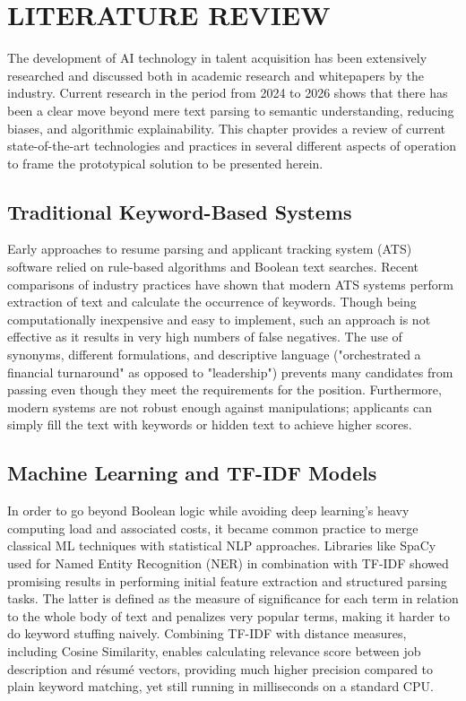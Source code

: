 \chapter{LITERATURE REVIEW}

The development of AI technology in talent acquisition has been extensively researched and discussed both in academic research and whitepapers by the industry. Current research in the period from 2024 to 2026 shows that there has been a clear move beyond mere text parsing to semantic understanding, reducing biases, and algorithmic explainability. This chapter provides a review of current state-of-the-art technologies and practices in several different aspects of operation to frame the prototypical solution to be presented herein.

\section{Traditional Keyword-Based Systems}
Early approaches to resume parsing and applicant tracking system (ATS) software relied on rule-based algorithms and Boolean text searches. Recent comparisons of industry practices have shown that modern ATS systems perform extraction of text and calculate the occurrence of keywords. Though being computationally inexpensive and easy to implement, such an approach is not effective as it results in very high numbers of false negatives. The use of synonyms, different formulations, and descriptive language ("orchestrated a financial turnaround" as opposed to "leadership") prevents many candidates from passing even though they meet the requirements for the position. Furthermore, modern systems are not robust enough against manipulations; applicants can simply fill the text with keywords or hidden text to achieve higher scores.

\section{Machine Learning and TF-IDF Models}
In order to go beyond Boolean logic while avoiding deep learning's heavy computing load and associated costs, it became common practice to merge classical ML techniques with statistical NLP approaches. Libraries like SpaCy used for Named Entity Recognition (NER) in combination with TF-IDF showed promising results in performing initial feature extraction and structured parsing tasks. The latter is defined as the measure of significance for each term in relation to the whole body of text and penalizes very popular terms, making it harder to do keyword stuffing naively. Combining TF-IDF with distance measures, including Cosine Similarity, enables calculating relevance score between job description and résumé vectors, providing much higher precision compared to plain keyword matching, yet still running in milliseconds on a standard CPU.

